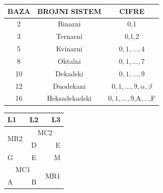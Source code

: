 \documentclass[a4paper,10pt]{article}
\begin{document}
\begin{minipage}[t]{0.45\textwidth}
    \centering{}
    \begin{tabular}{c c c}
        \hline \hline
        \rowcolor[RGB]{77,77,77}\color {white}BAZA & \color{white}BROJNI SISTEM & \color {white}CIFRE         \\ \hline \hline
        2                                          & Binarni                    & 0,1                         \\
        \rowcolor[RGB]{242,242,242} 3              & Ternarni                   & 0,1,2                       \\
        5                                          & Kvinarni                   & $0,1,\hdots,4$              \\
        \rowcolor[RGB]{242,242,242} 8              & Oktalni                    & $0,1,\hdots,7$              \\
        10                                         & Dekadski                   & $0,1,\hdots,9$              \\
        \rowcolor[RGB]{242,242,242} 12             & Duodekani                  & $0,1,\hdots,9,\alpha,\beta$ \\
        16                                         & Heksadekadski              & $0,1,\hdots,9$,A,$\hdots$,F \\ \hline \hline
    \end{tabular}
    \label{Tabelica:tab2}
\end{minipage}
\begin{minipage}[t]{0.45\textwidth}
    \centering{}
    \begin{tabular}{|l|c|r|}
        \hline \hline
        \cellcolor[RGB]{204,255,204}L1                        & L2                            & L3 \\ \hline
        \multirow{2}{*}{MR2}                                  & \multicolumn{2}{c|}{MC2}           \\ \cline{2-2} & D & \cellcolor[RGB]{255,230,204}E \\ \hline
        G                                                     & \cellcolor[RGB]{255,204,204}E & M  \\ \hline
        \multicolumn{2}{|c|}{\cellcolor[RGB]{204,204,255}MC1} & \multirow{2}{*}{MR1}               \\ \cline{1-2} A & B & \\ \hline \hline
    \end{tabular}
    \label{Tabelica:tab3}
\end{minipage}\hfill{}
\end{document}
